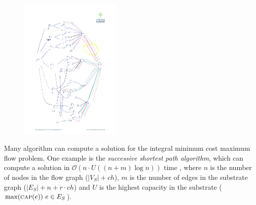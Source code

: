 \documentclass[9pt,twocolumn]{scrartcl}
\newcommand{\Capacity}{\ensuremath{\textsc{cap}}}
\newcommand{\RedundancyFactor}{\ensuremath{r}}
\newcommand{\SubstrateNodes}{\ensuremath{V_S}}
\newcommand{\SubstrateEdges}{\ensuremath{E_S}}
\newcommand{\SubstrateEdge}{\ensuremath{e}}
\newcommand{\Vms}{\ensuremath{n}}
\newcommand{\ChunkTypes}{\ensuremath{ch}}
\begin{document}
\begin{figure}
\includegraphics[angle=90,origin=c, height=7cm]{figs/model_fig_skteches/flow}
\end{figure}


Many algorithm can compute a solution for the integral minimum cost maximum
flow problem. One example is the \textit{successive shortest path algorithm},
which can compute a solution in $\mathcal{O}(n \cdot U((n+m)\log n)
)$ time \cite{successive_shortest_path_complexity}, where $n$ is the number of
nodes in the flow graph ($|\SubstrateNodes| + \ChunkTypes$), $m$ is the number
of edges in the substrate graph ($|\SubstrateEdges| + \Vms + \RedundancyFactor
\cdot \ChunkTypes$) and $U$ is the highest capacity in the substrate
($\max(\Capacity(\SubstrateEdge))~\SubstrateEdge\in\SubstrateEdges$).
\end{document}
